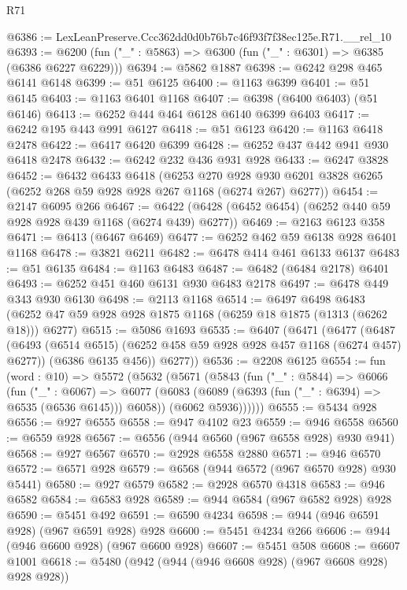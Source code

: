 \begin{lexlean}{R71}
\begin{coremodule}
@6386 := LexLeanPreserve.Ccc362dd0d0b76b7c46f93f7f38ec125e.R71.__rel_10
@6393 := @6200 (fun ("_" : @5863) => @6300 (fun ("_" : @6301) => @6385 (@6386 @6227 @6229)))
@6394 := @5862 @1887
@6398 := @6242 @298 @465 @6141 @6148
@6399 := @51 @6125
@6400 := @1163 @6399
@6401 := @51 @6145
@6403 := @1163 @6401 @1168
@6407 := @6398 (@6400 @6403) (@51 @6146)
@6413 := @6252 @444 @464 @6128 @6140 @6399 @6403
@6417 := @6242 @195 @443 @991 @6127
@6418 := @51 @6123
@6420 := @1163 @6418 @2478
@6422 := @6417 @6420 @6399
@6428 := @6252 @437 @442 @941 @930 @6418 @2478
@6432 := @6242 @232 @436 @931 @928
@6433 := @6247 @3828
@6452 := @6432
    @6433
    @6418
    (@6253
      @270
      @928
      @930
      @6201
      @3828
      @6265
      (@6252 @268 @59 @928 @928 @267 @1168 (@6274 @267) @6277))
@6454 := @2147 @6095 @266
@6467 := @6422 (@6428 (@6452 @6454) (@6252 @440 @59 @928 @928 @439 @1168 (@6274 @439) @6277))
@6469 := @2163 @6123 @358
@6471 := @6413 (@6467 @6469)
@6477 := @6252 @462 @59 @6138 @928 @6401 @1168
@6478 := @3821 @6211
@6482 := @6478 @414 @461 @6133 @6137
@6483 := @51 @6135
@6484 := @1163 @6483
@6487 := @6482 (@6484 @2178) @6401
@6493 := @6252 @451 @460 @6131 @930 @6483 @2178
@6497 := @6478 @449 @343 @930 @6130
@6498 := @2113 @1168
@6514 := @6497
    @6498
    @6483
    (@6252 @47 @59 @928 @928 @1875 @1168 (@6259 @18 @1875 (@1313 (@6262 @18))) @6277)
@6515 := @5086 @1693
@6535 := @6407
    (@6471
      (@6477
        (@6487
          (@6493 (@6514 @6515) (@6252 @458 @59 @928 @928 @457 @1168 (@6274 @457) @6277))
          (@6386 @6135 @456))
        @6277))
@6536 := @2208 @6125
@6554 := fun (word : @10) =>
  @5572
    (@5632
      (@5671
        (@5843
          (fun ("_" : @5844) =>
          @6066
            (fun ("_" : @6067) =>
            @6077
              (@6083 (@6089 (@6393 (fun ("_" : @6394) => @6535 (@6536 @6145))) @6058))
              (@6062 @5936))))))
@6555 := @5434 @928
@6556 := @927 @6555
@6558 := @947 @4102 @23
@6559 := @946 @6558
@6560 := @6559 @928
@6567 := @6556 (@944 @6560 (@967 @6558 @928) @930 @941)
@6568 := @927 @6567
@6570 := @2928 @6558 @2880
@6571 := @946 @6570
@6572 := @6571 @928
@6579 := @6568 (@944 @6572 (@967 @6570 @928) @930 @5441)
@6580 := @927 @6579
@6582 := @2928 @6570 @4318
@6583 := @946 @6582
@6584 := @6583 @928
@6589 := @944 @6584 (@967 @6582 @928) @928
@6590 := @5451 @492
@6591 := @6590 @4234
@6598 := @944 (@946 @6591 @928) (@967 @6591 @928) @928
@6600 := @5451 @4234 @266
@6606 := @944 (@946 @6600 @928) (@967 @6600 @928)
@6607 := @5451 @508
@6608 := @6607 @1001
@6618 := @5480 (@942 (@944 (@946 @6608 @928) (@967 @6608 @928) @928 @928))

\end{coremodule}
\end{lexlean}
